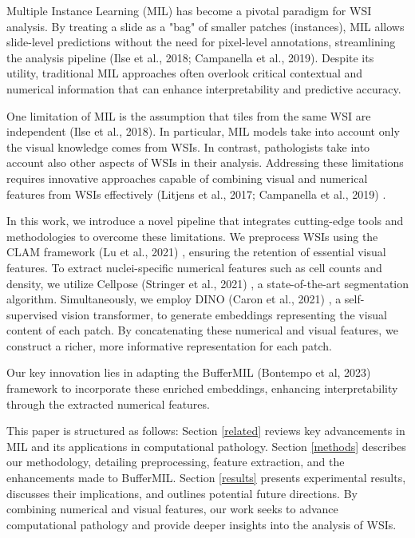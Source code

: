 \documentclass[10pt,twocolumn]{article}
\begin{document}
Multiple Instance Learning (MIL) has become a pivotal paradigm for WSI analysis. By treating a slide as a "bag" of smaller patches (instances), MIL allows slide-level predictions without the need for pixel-level annotations, streamlining the analysis pipeline (Ilse et al., 2018; Campanella et al., 2019)\cite{ilse2018attention, campanella2019clinical}. Despite its utility, traditional MIL approaches often overlook critical contextual and numerical information that can enhance interpretability and predictive accuracy.

One limitation of MIL is the assumption that tiles from the same WSI are independent (Ilse et al., 2018)\cite{ilse2018attention}. In particular, MIL models take into account only the visual knowledge comes from WSIs. In contrast, pathologists take into account also other aspects of WSIs in their analysis. Addressing these limitations requires innovative approaches capable of combining visual and numerical features from WSIs effectively (Litjens et al., 2017; Campanella et al., 2019) \cite{litjens2017survey, campanella2019clinical}.

In this work, we introduce a novel pipeline that integrates cutting-edge tools and methodologies to overcome these limitations. We preprocess WSIs using the CLAM framework (Lu et al., 2021) \cite{lu2021clam}, ensuring the retention of essential visual features. To extract nuclei-specific numerical features such as cell counts and density, we utilize Cellpose (Stringer et al., 2021) \cite{stringer2021cellpose}, a state-of-the-art segmentation algorithm. Simultaneously, we employ DINO (Caron et al., 2021) \cite{caron2021emerging}, a self-supervised vision transformer, to generate embeddings representing the visual content of each patch. By concatenating these numerical and visual features, we construct a richer, more informative representation for each patch.

Our key innovation lies in adapting the BufferMIL (Bontempo et al, 2023)\cite{10.1007/978-3-031-43153-1_1} framework to incorporate these enriched embeddings, enhancing interpretability through the extracted numerical features.


This paper is structured as follows: Section \ref{related} reviews key advancements in MIL and its applications in computational pathology. Section \ref{methods} describes our methodology, detailing preprocessing, feature extraction, and the enhancements made to BufferMIL. Section \ref{results} presents experimental results, discusses their implications, and outlines potential future directions. By combining numerical and visual features, our work seeks to advance computational pathology and provide deeper insights into the analysis of WSIs.
\end{document}
